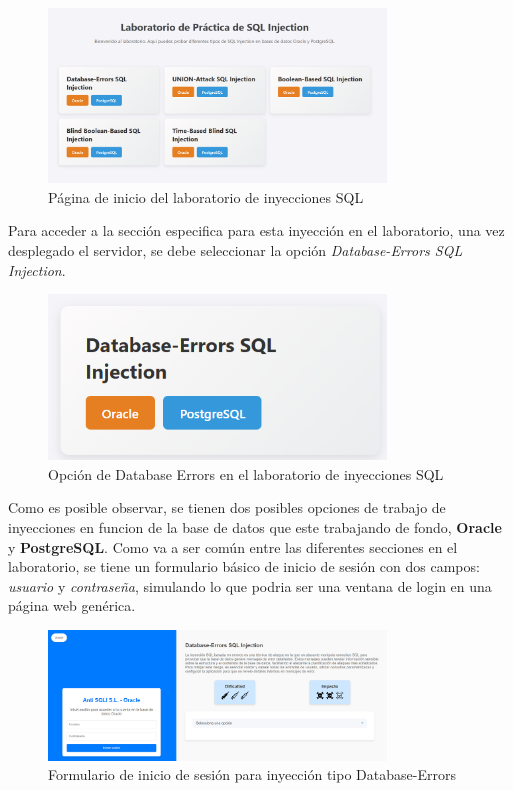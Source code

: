 \documentclass[a4paper,12pt]{article}
\begin{document}
\begin{figure}[H]
    \centering
    \includegraphics[width=0.8\textwidth]{Imagenes/MenuPrincipalLaboratorio.png}
    \caption{Página de inicio del laboratorio de inyecciones SQL}
\end{figure}

Para acceder a la sección especifica para esta inyección en el laboratorio, una vez desplegado el servidor, se debe seleccionar la opción \textit{Database-Errors SQL Injection}.

\begin{figure}[H]
    \centering
    \includegraphics[width=0.8\textwidth]{Imagenes/error1.png}
    \caption{Opción de Database Errors en el laboratorio de inyecciones SQL}
\end{figure}

Como es posible observar, se tienen dos posibles opciones de trabajo de inyecciones en funcion de la base de datos que este trabajando de fondo, \textbf{Oracle} y \textbf{PostgreSQL}.
Como va a ser común entre las diferentes secciones en el laboratorio, se tiene un formulario básico de inicio de sesión con dos campos: \textit{usuario} y \textit{contraseña},
simulando lo que podria ser una ventana de login en una página web genérica.

\begin{figure}[H]
    \centering
    \includegraphics[width=0.8\textwidth]{Imagenes/error2.png}
    \caption{Formulario de inicio de sesión para inyección tipo Database-Errors}
\end{figure}
\end{document}
